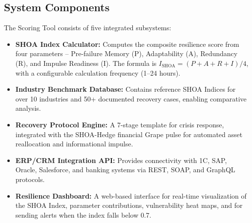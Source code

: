 \documentclass[12pt]{article}
\begin{document}
\subsection{System Components}
The Scoring Tool consists of five integrated subsystems:
\begin{itemize}
    \item \textbf{SHOA Index Calculator:} Computes the composite resilience score from four parameters -- Pre-failure Memory (P), Adaptability (A), Redundancy (R), and Impulse Readiness (I). The formula is $I_{\text{SHOA}} = (P + A + R + I)/4$, with a configurable calculation frequency (1--24 hours).
    \item \textbf{Industry Benchmark Database:} Contains reference SHOA Indices for over 10 industries and 50+ documented recovery cases, enabling comparative analysis.
    \item \textbf{Recovery Protocol Engine:} A 7-stage template for crisis response, integrated with the SHOA-Hedge financial Grape pulse for automated asset reallocation and informational impulse.
    \item \textbf{ERP/CRM Integration API:} Provides connectivity with 1C, SAP, Oracle, Salesforce, and banking systems via REST, SOAP, and GraphQL protocols.
    \item \textbf{Resilience Dashboard:} A web-based interface for real-time visualization of the SHOA Index, parameter contributions, vulnerability heat maps, and for sending alerts when the index falls below 0.7.
\end{itemize}
\end{document}

